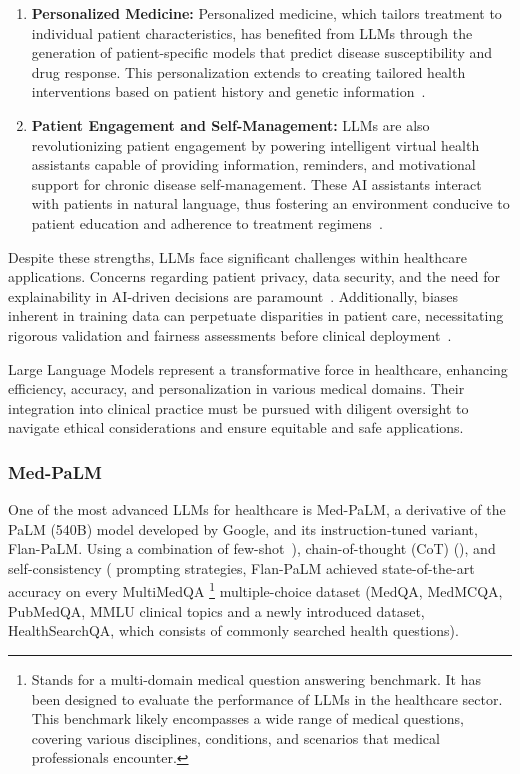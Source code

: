 \begin{enumerate}
	\item \textbf{Personalized Medicine:}{
		      Personalized medicine, which tailors treatment to individual patient characteristics, has benefited from LLMs through the generation of patient-specific models that predict disease susceptibility and drug response. This personalization extends to creating tailored health interventions based on patient history and genetic information~\cite{hamburg2010path}.
	      }

	\item \textbf{Patient Engagement and Self-Management:}{
		      LLMs are also revolutionizing patient engagement by powering intelligent virtual health assistants capable of providing information, reminders, and motivational support for chronic disease self-management. These AI assistants interact with patients in natural language, thus fostering an environment conducive to patient education and adherence to treatment regimens~\cite{kocaballi2019personalization}.
	      }
\end{enumerate}

Despite these strengths, LLMs face significant challenges within healthcare applications.
Concerns regarding patient privacy, data security, and the need for explainability in AI-driven decisions are paramount~\cite{beam2018big}.
Additionally, biases inherent in training data can perpetuate disparities in patient care, necessitating rigorous validation and fairness assessments before clinical deployment~\cite{chen2019single}.

Large Language Models represent a transformative force in healthcare, enhancing efficiency, accuracy, and personalization in various medical domains.
Their integration into clinical practice must be pursued with diligent oversight to navigate ethical considerations and ensure equitable and safe applications.

\subsubsection{Med-PaLM}
\label{subsubsec:med-palm}

One of the most advanced LLMs for healthcare is Med-PaLM, a derivative of the PaLM (540B) model developed by Google, and its instruction-tuned variant, Flan-PaLM. Using a combination of few-shot~\cite{brown2020language}), chain-of-thought (CoT) (\textcite{wei2022chain}), and self-consistency (\textcite{wang2022self} prompting strategies, Flan-PaLM achieved state-of-the-art accuracy on every MultiMedQA \footnote{Stands for a multi-domain medical question answering benchmark. It has been designed to evaluate the performance of LLMs in the healthcare sector.
	This benchmark likely encompasses a wide range of medical questions, covering various disciplines, conditions, and scenarios that medical professionals encounter.} multiple-choice dataset (MedQA, MedMCQA, PubMedQA, MMLU clinical topics and a newly introduced dataset, HealthSearchQA, which consists of commonly searched health questions).


